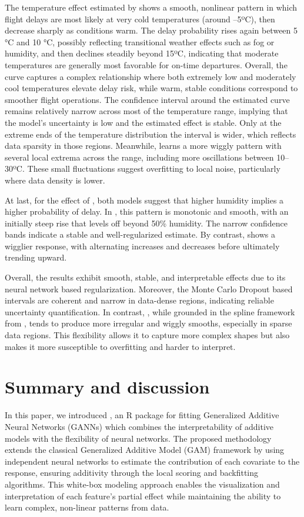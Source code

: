 The temperature effect estimated by  shows a smooth, nonlinear pattern in which flight delays are most likely at very cold temperatures (around –5ºC), then decrease sharply as conditions warm. The delay probability rises again between 5 °C and 10 °C, possibly reflecting transitional weather effects such as fog or humidity, and then declines steadily beyond 15ºC, indicating that moderate temperatures are generally most favorable for on-time departures. Overall, the curve captures a complex relationship where both extremely low and moderately cool temperatures elevate delay risk, while warm, stable conditions correspond to smoother flight operations. The confidence interval around the estimated curve remains relatively narrow across most of the temperature range, implying that the model’s uncertainty is low and the estimated effect is stable. Only at the extreme ends of the temperature distribution the interval is wider, which reflects data sparsity in those regions. Meanwhile,  learns a more wiggly pattern with several local extrema across the range, including more oscillations between 10–30ºC. These small fluctuations suggest overfitting to local noise, particularly where data density is lower.

At last, for the effect of , both models suggest that higher humidity implies a higher probability of delay.
In , this pattern is monotonic and smooth, with an initially steep rise that levels off beyond 50\% humidity. The narrow confidence bands indicate a stable and well-regularized estimate. By contrast,  shows a wigglier response, with alternating increases and decreases before ultimately trending upward.

Overall, the  results exhibit smooth, stable, and interpretable effects due to its neural network based regularization. Moreover, the Monte Carlo Dropout based intervals are coherent and narrow in data-dense regions, indicating reliable uncertainty quantification. In contrast, , while grounded in the spline framework from , tends to produce more irregular and wiggly smooths, especially in sparse data regions. This flexibility allows it to capture more complex shapes but also makes it more susceptible to overfitting and harder to interpret.

\section{Summary and discussion} \label{sec:summary}
In this paper, we introduced , an \textsf{R} package for fitting Generalized Additive Neural Networks (GANNs) which combines the interpretability of additive models with the flexibility of neural networks. The proposed methodology extends the classical Generalized Additive Model (GAM) framework by using independent neural networks to estimate the contribution of each covariate to the response, ensuring additivity through the local scoring and backfitting algorithms. This white-box modeling approach enables the visualization and interpretation of each feature's partial effect while maintaining the ability to learn complex, non-linear patterns from data.

